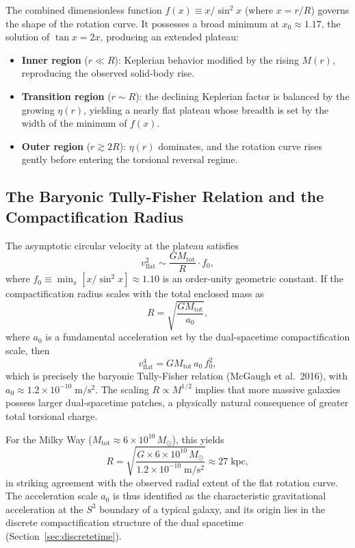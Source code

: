 \documentclass[dvipdfmx,a4paper]{article}
\begin{document}
The combined dimensionless function $f(x) \equiv x / \sin^2 x$ (where $x = r/R$) governs the shape of the rotation curve. It possesses a broad minimum at $x_0 \approx 1.17$, the solution of $\tan x = 2x$, producing an extended plateau:
\begin{itemize}
  \item \textbf{Inner region} ($r \ll R$): Keplerian behavior modified by the rising $M(r)$, reproducing the observed solid-body rise.
  \item \textbf{Transition region} ($r \sim R$): the declining Keplerian factor is balanced by the growing $\eta(r)$, yielding a nearly flat plateau whose breadth is set by the width of the minimum of $f(x)$.
  \item \textbf{Outer region} ($r \gtrsim 2R$): $\eta(r)$ dominates, and the rotation curve rises gently before entering the torsional reversal regime.
\end{itemize}

\subsection{The Baryonic Tully-Fisher Relation and the Compactification Radius}

The asymptotic circular velocity at the plateau satisfies
\[
v_{\text{flat}}^2 \sim \frac{GM_{\text{tot}}}{R} \cdot f_0,
\]
where $f_0 \equiv \min_x [x/\sin^2 x] \approx 1.10$ is an order-unity geometric constant. If the compactification radius scales with the total enclosed mass as
\[
R = \sqrt{\frac{GM_{\text{tot}}}{a_0}},
\]
where $a_0$ is a fundamental acceleration set by the dual-spacetime compactification scale, then
\[
v_{\text{flat}}^4 = G M_{\text{tot}} \, a_0 \, f_0^2,
\]
which is precisely the baryonic Tully-Fisher relation (McGaugh et al.\ 2016), with $a_0 \approx 1.2 \times 10^{-10}\;\mathrm{m/s^2}$. The scaling $R \propto M^{1/2}$ implies that more massive galaxies possess larger dual-spacetime patches, a physically natural consequence of greater total torsional charge.

For the Milky Way ($M_{\text{tot}} \approx 6 \times 10^{10}\,M_\odot$), this yields
\[
R = \sqrt{\frac{G \times 6 \times 10^{10}\,M_\odot}{1.2 \times 10^{-10}\;\mathrm{m/s^2}}} \approx 27\;\mathrm{kpc},
\]
in striking agreement with the observed radial extent of the flat rotation curve. The acceleration scale $a_0$ is thus identified as the characteristic gravitational acceleration at the $S^3$ boundary of a typical galaxy, and its origin lies in the discrete compactification structure of the dual spacetime (Section~\ref{sec:discretetime}).
\end{document}
